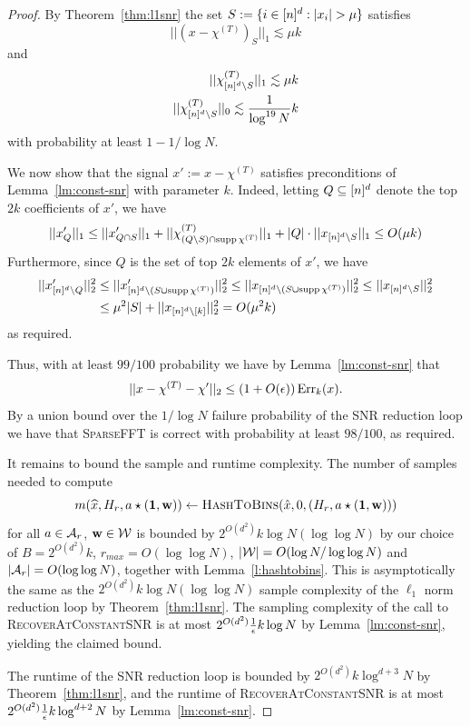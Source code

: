 \begin{proof}
By Theorem~\ref{thm:l1snr} the set $S:=\{i\in \nsq: |x_i|>\mu\}$ satisfies
$$
||(x-\chi^{(T)})_S||_1\lesssim \mu k
$$
and
\begin{equation*}
\begin{split}
||\chi^{(T)}_{{[n]^d}\setminus S}||_1\lesssim \mu k\\
||\chi^{(T)}_{{[n]^d}\setminus S}||_0\lesssim \frac1{\log^{19} N}k\\
\end{split}
\end{equation*}
with probability at least $1-1/\log N$.

We now show that the signal $x':=x-\chi^{(T)}$ satisfies preconditions of Lemma~\ref{lm:const-snr} with parameter $k$. Indeed, letting $Q\subseteq {[n]^d}$ denote the top $2k$ coefficients of $x'$, we have 
\begin{equation*}
\begin{split}
||x'_Q||_1&\leq ||x'_{Q\cap S}||_1+||\chi^{(T)}_{(Q\setminus S)\cap \operatorname{supp} \chi^{(T)}}||_1+|Q|\cdot ||x_{{[n]^d}\setminus S}||_1\leq O(\mu k)\\
\end{split}
\end{equation*}
Furthermore, since $Q$ is the set of top $2k$ elements of $x'$, we have 
\begin{equation*}
\begin{split}
||x'_{{[n]^d}\setminus Q}||_2^2&\leq ||x'_{{[n]^d}\setminus (S\cup \operatorname{supp} \chi^{(T)})}||_2^2\leq ||x_{{[n]^d}\setminus (S\cup \operatorname{supp} \chi^{(T)})}||_2^2\leq ||x_{{[n]^d}\setminus S}||_2^2\\
&\leq \mu^2 |S|+||x_{{[n]^d}\setminus [k]}||_2^2=O(\mu^2 k)
\end{split}
\end{equation*}
as required.



Thus, with at least $99/100$ probability we have by Lemma~\ref{lm:const-snr} that
$$
||x-\chi^{(T)}-\chi'||_2\leq (1+O({\epsilon}))\operatorname{Err}_{k}(x).
$$
By a union bound over the $1/\log N$ failure probability of the SNR reduction loop we have that \textsc{SparseFFT} is correct with probability at least $98/100$, as required.


It remains to bound the sample and runtime complexity. The number of samples needed to compute 
$$
m(\wh{x}, H_r, a\star(\one, \h))\gets \Call{HashToBins}{\hat x, 0, (H_r, a\star (\one, \h))}
$$
 for all $a\in {\mathcal{A}}_r$, $\mathbf{w}\in \mathcal{W}$ is bounded by $2^{O(d^2)} k\log N (\log\log N)$ by our choice of $B=2^{O(d^2)}k$, $r_{max}=O(\log\log N)$, $|\mathcal{W}|=O(\log N/\log \log N)$ and $|{\mathcal{A}}_r|=O(\log\log N)$, together with Lemma~\ref{l:hashtobins}. This is asymptotically the same as the $2^{O(d^2)} k \log N (\log\log N)$ sample complexity of the $\ell_1$ norm reduction loop by Theorem~\ref{thm:l1snr}. The sampling complexity of the call to \textsc{RecoverAtConstantSNR} is at most $2^{O(d^2)} \frac1{{\epsilon}}k \log N$ by Lemma~\ref{lm:const-snr}, yielding the claimed bound.

The runtime of the SNR reduction loop is bounded by $2^{O(d^2)}k \log^{d+3} N$ by Theorem~\ref{thm:l1snr}, and the runtime of \textsc{RecoverAtConstantSNR} is at most $2^{O(d^2)} \frac1{{\epsilon}}k \log^{d+2} N$ by Lemma~\ref{lm:const-snr}.
\end{proof}





